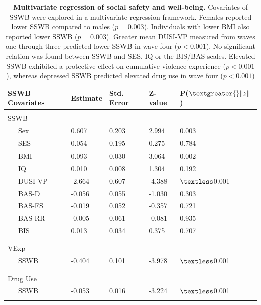 \documentclass[utf8]{article}
\begin{document}
\begin{table}[]
\begin{tabular}{lllll}
SSWB Covariates  & Estimate & Std. Error & Z-value & P($\textgreater{}\|z\|$) \\ \hline
            &          &            &         &                          \\
SSWB        &          &            &         &                          \\
\ \ \ Sex         & 0.607    & 0.203      & 2.994   & 0.003                    \\
\ \ \ SES         & 0.054    & 0.195      & 0.275   & 0.784                    \\
\ \ \ BMI         & 0.093    & 0.030      & 3.064   & 0.002                    \\
\ \ \ IQ          & 0.010    & 0.008      & 1.304   & 0.192                    \\
\ \ \ DUSI-VP     & -2.664   & 0.607      & -4.388  & $\textless$0.001                    \\
\ \ \ BAS-D       & -0.056   & 0.055      & -1.030  & 0.303                    \\
\ \ \ BAS-FS      & -0.019   & 0.052      & -0.357  & 0.721                    \\
\ \ \ BAS-RR      & -0.005   & 0.061      & -0.081  & 0.935                    \\
\ \ \ BIS         & 0.013    & 0.034      & 0.375   & 0.707 \\ \\ \hline \\ 
VExp        &          &            &         &                          \\
\ \ \ SSWB        & -0.404   & 0.101      & -3.978  & $\textless$0.001                    \\
            &          &            &         &                          \\ \hline \\ 
Drug Use      &          &            &         &                          \\
\ \ \ SSWB        & -0.053   & 0.016      & -3.224  & $\textless$0.001                    \\
            &          &            &         &                          \\
\end{tabular}
\caption{\textbf{Multivariate regression of social safety and well-being.} Covariates of SSWB were explored in a multivariate regression framework. Females reported lower SSWB compared to males ($p=0.003$). Individuals with lower BMI also reported lower SSWB ($p=0.003$). Greater mean DUSI-VP measured from waves one through three predicted lower SSWB in wave four ($p<0.001$). No significant relation was found between SSWB and SES, IQ or the BIS/BAS scales. Elevated SSWB exhibited a protective effect on cumulative violence experience ($p<0.001$), whereas depressed SSWB predicted elevated drug use in wave four ($p<0.001$) \label{tab:8}}
\end{table}
\end{document}
